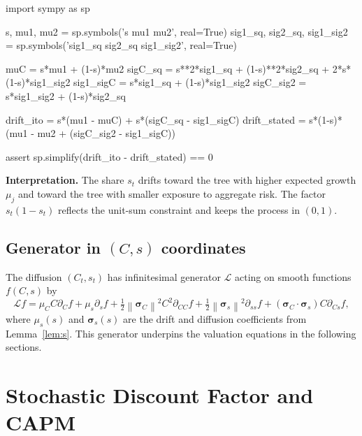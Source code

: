 ﻿\documentclass[11pt,letterpaper,oneside]{article}
\numberwithin{equation}{section}
\newcommand{\1}{\mathbf{1}}
\newcommand{\norm}[1]{\left\lVert #1\right\rVert}
\begin{document}
\begin{sympycheck}[title={Verification: Share dynamics (Lemma~\ref{lem:s})}]
\begin{pyconsole}
import sympy as sp

s, mu1, mu2 = sp.symbols('s mu1 mu2', real=True)
sig1_sq, sig2_sq, sig1_sig2 = sp.symbols('sig1_sq sig2_sq sig1_sig2', real=True)

muC = s*mu1 + (1-s)*mu2
sigC_sq = s**2*sig1_sq + (1-s)**2*sig2_sq + 2*s*(1-s)*sig1_sig2
sig1_sigC = s*sig1_sq + (1-s)*sig1_sig2
sigC_sig2 = s*sig1_sig2 + (1-s)*sig2_sq

drift_ito = s*(mu1 - muC) + s*(sigC_sq - sig1_sigC)
drift_stated = s*(1-s)*(mu1 - mu2 + (sigC_sig2 - sig1_sigC))

assert sp.simplify(drift_ito - drift_stated) == 0
\end{pyconsole}
\end{sympycheck}

\begin{tcolorbox}[didacticstyle]
\textbf{Interpretation.} The share $s_t$ drifts toward the tree with higher expected growth $\mu_j$ and toward the tree with smaller exposure to aggregate risk. The factor $s_t(1-s_t)$ reflects the unit-sum constraint and keeps the process in $(0,1)$.
\end{tcolorbox}
\subsection{Generator in $(C,s)$ coordinates}
The diffusion $(C_t,s_t)$ has infinitesimal generator $\mathcal{L}$ acting on smooth functions $f(C,s)$ by
\[
  \mathcal{L}f = \mu_C C \partial_C f + \mu_s \partial_s f + \tfrac12 \norm{\bm{\sigma}_C}^2 C^2 \partial_{CC} f + \tfrac12 \norm{\bm{\sigma}_s}^2 \partial_{ss} f + (\bm{\sigma}_C\cdot\bm{\sigma}_s) C \partial_{Cs} f,
\]
where $\mu_s(s)$ and $\bm{\sigma}_s(s)$ are the drift and diffusion coefficients from Lemma~\ref{lem:s}. This generator underpins the valuation equations in the following sections.

\section{Stochastic Discount Factor and CAPM}\label{sec:sdf}
\end{document}
